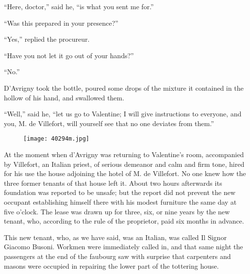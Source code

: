 “Here, doctor,” said he, “is what you sent me for.”

“Was this prepared in your presence?”

“Yes,” replied the procureur.

“Have you not let it go out of your hands?”

“No.”

D’Avrigny took the bottle, poured some drops of the mixture it
contained in the hollow of his hand, and swallowed them.

“Well,” said he, “let us go to Valentine; I will give instructions to
everyone, and you, M. de Villefort, will yourself see that no one
deviates from them.”

\begin{figure}[ht]
\texttt{[image: 40294m.jpg]}
\end{figure}

At the moment when d’Avrigny was returning to Valentine’s room,
accompanied by Villefort, an Italian priest, of serious demeanor and
calm and firm tone, hired for his use the house adjoining the hotel of
M. de Villefort. No one knew how the three former tenants of that house
left it. About two hours afterwards its foundation was reported to be
unsafe; but the report did not prevent the new occupant establishing
himself there with his modest furniture the same day at five o’clock.
The lease was drawn up for three, six, or nine years by the new tenant,
who, according to the rule of the proprietor, paid six months in
advance.

This new tenant, who, as we have said, was an Italian, was called Il
Signor Giacomo Busoni. Workmen were immediately called in, and that
same night the passengers at the end of the faubourg saw with surprise
that carpenters and masons were occupied in repairing the lower part of
the tottering house.
